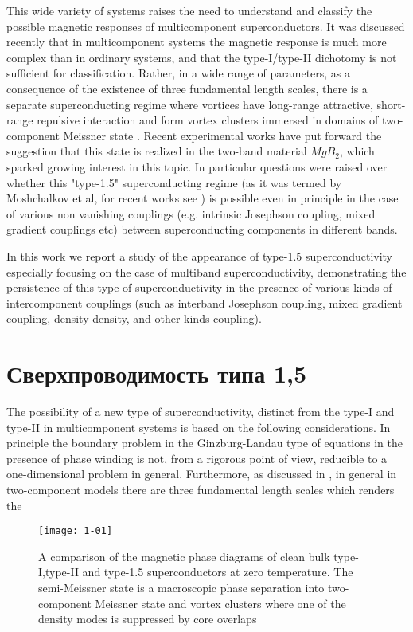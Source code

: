 This wide variety of systems raises the need to understand and classify the 
possible magnetic responses of multicomponent superconductors. It was 
discussed recently that in multicomponent systems the magnetic response is 
much more complex than in ordinary systems, and that the type-I/type-II 
dichotomy is not sufficient for classification. Rather, in a wide range of 
parameters, as a consequence of the existence of three fundamental length 
scales, there is a separate superconducting regime where vortices have 
long-range attractive, short-range repulsive interaction and form vortex 
clusters immersed in domains of two-component Meissner state 
\cite{bib:1,bib:2}. Recent experimental works \cite{bib:16,bib:17} have put 
forward the suggestion that this state is realized in the two-band material 
\( MgB_2 \), which sparked growing interest in this topic. In particular 
questions were raised over whether this "type-1.5" superconducting regime (as 
it was termed by Moshchalkov et al\cite{bib:16}, for recent works see
\cite{bib:18}) is possible even in principle in the case of various non 
vanishing couplings (e.g. intrinsic Josephson coupling, mixed gradient 
couplings etc) between superconducting components in different bands. 

In this work we report a study of the appearance of type-1.5 superconductivity 
especially focusing on the case of multiband superconductivity, demonstrating 
the persistence of this type of superconductivity in the presence of various 
kinds of intercomponent couplings (such as interband Josephson coupling, mixed 
gradient coupling, density-density, and other kinds coupling).

\section{Сверхпроводимость типа 1,5}
\label{sec:1-1}

The possibility of a new type of superconductivity, distinct from the type-I 
and type-II in multicomponent systems \cite{bib:1,bib:2} is based on the 
following considerations. In principle the boundary problem in the 
Ginzburg-Landau type of equations in the presence of phase winding is not, 
from a rigorous point of view, reducible to a one-dimensional problem in 
general. Furthermore, as discussed in \cite{bib:1,bib:2}, in general in 
two-component models there are three fundamental length scales which renders 
the

\begin{figure}[h!]
  \texttt{[image: 1-01]}
  \caption{A comparison of the magnetic phase diagrams of
    clean bulk type-I,type-II and type-1.5 superconductors at
    zero temperature. The semi-Meissner state is a macroscopic
    phase separation into two-component Meissner state and vortex
    clusters where one of the density modes is suppressed by
    core overlaps}
  \label{fig:1}
\end{figure}


